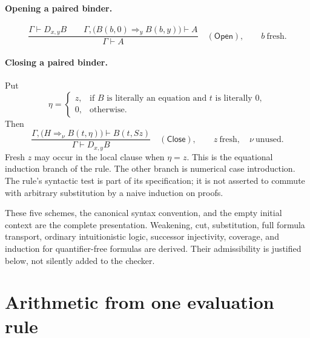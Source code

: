 \documentclass[10pt,letterpaper]{article}
\theoremstyle{definition}
\theoremstyle{remark}
\newcommand{\Open}{\mathsf{Open}}
\newcommand{\Close}{\mathsf{Close}}
\begin{document}
\paragraph{Opening a paired binder.}
\[
 \frac{\Gamma\vdash D_{x,y}B
       \qquad
       \Gamma,\bigl(B(b,0)\Rightarrow_y B(b,y)\bigr)\vdash A}
      {\Gamma\vdash A}
 \quad(\Open),
 \qquad b\ \text{fresh}.
\]

\paragraph{Closing a paired binder.}
Put
\[
 \eta=
 \begin{cases}
 z,&\text{if $B$ is literally an equation and $t$ is literally $0$},\\
 0,&\text{otherwise}.
 \end{cases}
\]
Then
\[
 \frac{\Gamma,\bigl(H\Rightarrow_\nu B(t,\eta)\bigr)
                    \vdash B(t,Sz)}
      {\Gamma\vdash D_{x,y}B}
 \quad(\Close),
 \qquad z\ \text{fresh},\quad \nu\ \text{unused}.
 \tag{Close}
\]
Fresh $z$ may occur in the local clause when $\eta=z$. This is the
equational induction branch of the rule. The other branch is numerical
case introduction. The rule's syntactic test is part of its specification;
it is not asserted to commute with arbitrary substitution by a naive
induction on proofs.

These five schemes, the canonical syntax convention, and the empty
initial context are the complete presentation. Weakening, cut, substitution,
full formula transport, ordinary intuitionistic logic, successor
injectivity, coverage, and induction for quantifier-free formulas are
derived. Their admissibility is justified below, not silently added to
the checker.

\section{Arithmetic from one evaluation rule}\label{sec:arithmetic}
\end{document}
